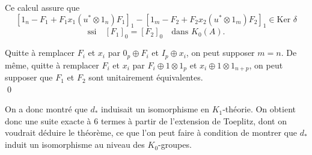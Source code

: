 \begin{dem}
Ce calcul assure que \[[1_n-F_1+F_1x_1(u^*\otimes 1_n)F_1]_1-[1_m-F_2+F_2x_2(u^*\otimes 1_m)F_2]_1\in \text{Ker }\delta\]
\[ \text{ssi}\quad[F_1]_0=[F_2]_0\quad \text{dans } K_0(A).\]

Quitte à remplacer $F_i$ et $x_i$ par $0_p \oplus F_i$ et $I_p\oplus x_i$, on peut supposer $m=n$. De même, quitte à remplacer $F_i$ et $x_i$ par $F_i\oplus 1\otimes 1_p$ et $x_i\oplus 1\otimes 1_{n+p}$, on peut supposer que $F_1$ et $F_2$ sont unitairement équivalentes.\\
\qed
\end{dem}
On a donc montré que $d_*$ induisait un isomorphisme en $K_1$-théorie. On obtient donc une suite exacte à $6$ termes à partir de l'extension de Toeplitz, dont on voudrait déduire le théorème, ce que l'on peut faire à condition de montrer que $d_*$ induit un isomorphisme au niveau des $K_0$-groupes.\\

